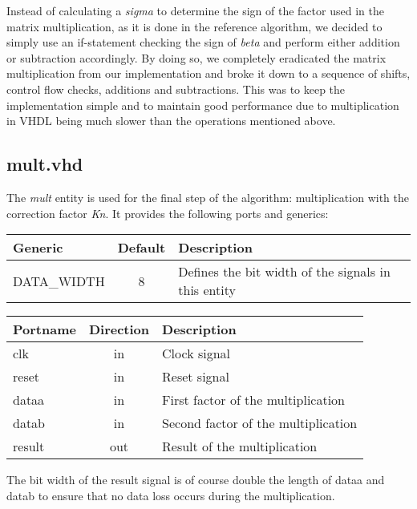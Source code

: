 Instead of calculating a \textit{sigma} to determine the sign of the factor used in the matrix multiplication, as it is done in the reference algorithm, we decided to simply use an if-statement checking the sign of \textit{beta} and perform either addition or subtraction accordingly. By doing so, we completely eradicated the matrix multiplication from our implementation and broke it down to a sequence of shifts, control flow checks, additions and subtractions. This was to keep the implementation simple and to maintain good performance due to multiplication in VHDL being much slower than the operations mentioned above.

\subsection{mult.vhd} 

The \textit{mult} entity is used for the final step of the algorithm:  multiplication with the correction factor \textit{Kn}. It provides the following ports and generics:

\begin{center}
	\begin{tabular}{ | l | c | l | }
		\hline
		\textbf{Generic} & \textbf{Default} & \textbf{Description} \\
		\hline
		DATA\_WIDTH & 8 & Defines the bit width of the signals in this entity \\
		\hline
	\end{tabular} 
\end{center}

\begin{center}
	\begin{tabular}{ | l | c | l | }
		\hline
		\textbf{Portname} & \textbf{Direction} & \textbf{Description} \\
		\hline
		clk & in & Clock signal \\
		reset & in  & Reset signal \\
		dataa & in  & First factor of the multiplication \\
		datab & in  & Second factor of the multiplication \\
		result & out  & Result of the multiplication \\
		\hline
	\end{tabular} 
\end{center}

The bit width of the result signal is of course double the length of dataa and datab to ensure that no data loss occurs during the multiplication.

